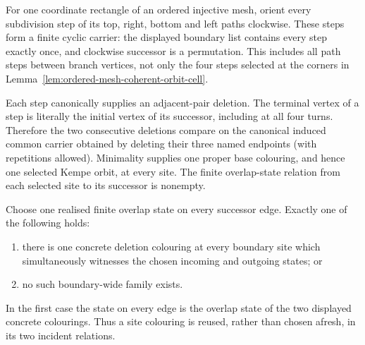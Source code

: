 \begin{lemma}
\label{lem:ordered-mesh-complete-boundary-relation}
For one coordinate rectangle of an ordered injective mesh, orient every
subdivision step of its top, right, bottom and left paths clockwise.  These
steps form a finite cyclic carrier: the displayed boundary list contains
every step exactly once, and clockwise successor is a permutation.  This
includes all path steps between branch vertices, not only the four steps
selected at the corners in
Lemma~\ref{lem:ordered-mesh-coherent-orbit-cell}.

Each step canonically supplies an adjacent-pair deletion.  The terminal
vertex of a step is literally the initial vertex of its successor, including
at all four turns.  Therefore the two consecutive deletions compare on the
canonical induced common carrier obtained by deleting their three named
endpoints (with repetitions allowed).  Minimality supplies one proper base
colouring, and hence one selected Kempe orbit, at every site.  The finite
overlap-state relation from each selected site to its successor is nonempty.

Choose one realised finite overlap state on every successor edge.  Exactly
one of the following holds:
\begin{enumerate}
\item there is one concrete deletion colouring at every boundary site which
  simultaneously witnesses the chosen incoming and outgoing states; or
\item no such boundary-wide family exists.
\end{enumerate}
In the first case the state on every edge is the overlap state of the two
displayed concrete colourings.  Thus a site colouring is reused, rather than
chosen afresh, in its two incident relations.
\end{lemma}

